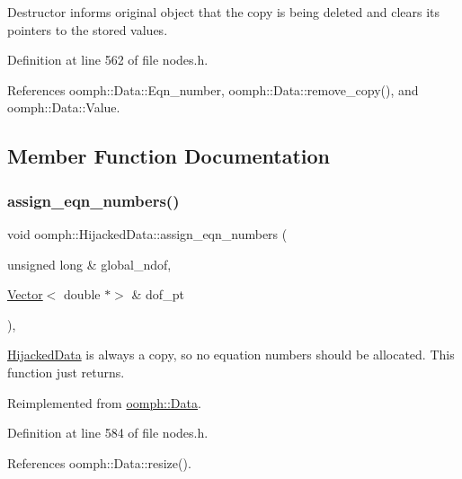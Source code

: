 Destructor informs original object that the copy is being deleted and clears its pointers to the stored values. 



Definition at line 562 of file nodes.\+h.



References oomph\+::\+Data\+::\+Eqn\+\_\+number, oomph\+::\+Data\+::remove\+\_\+copy(), and oomph\+::\+Data\+::\+Value.



\subsection{Member Function Documentation}
\mbox{\label{classoomph_1_1HijackedData_a960b9595a1d8049de58c76d3573d3a35}} 
\subsubsection{\texorpdfstring{assign\+\_\+eqn\+\_\+numbers()}{assign\_eqn\_numbers()}}
{\footnotesize\ttfamily void oomph\+::\+Hijacked\+Data\+::assign\+\_\+eqn\+\_\+numbers (\begin{DoxyParamCaption}\item[{unsigned long \&}]{global\+\_\+ndof,  }\item[{\hyperlink{classoomph_1_1Vector}{Vector}$<$ double $\ast$$>$ \&}]{dof\+\_\+pt }\end{DoxyParamCaption})\hspace{0.3cm}{\ttfamily [inline]}, {\ttfamily [virtual]}}



\hyperlink{classoomph_1_1HijackedData}{Hijacked\+Data} is always a copy, so no equation numbers should be allocated. This function just returns. 



Reimplemented from \hyperlink{classoomph_1_1Data_a7b26834562644d212f8bb5c7ed482c61}{oomph\+::\+Data}.



Definition at line 584 of file nodes.\+h.



References oomph\+::\+Data\+::resize().

\mbox{\label{classoomph_1_1HijackedData_aff8443f8455e18b3893c094326c4d212}} 
